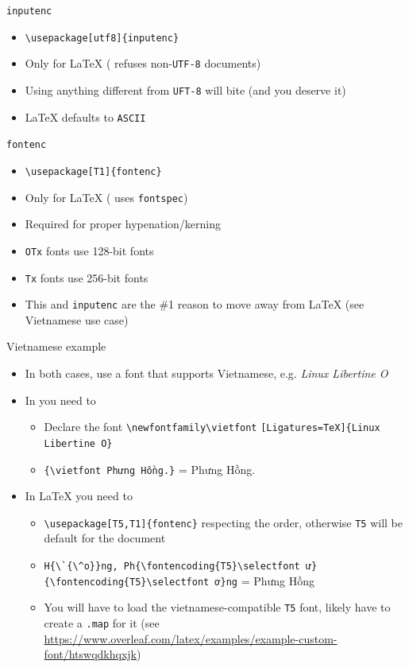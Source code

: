 \documentclass[english]{beamer}
\let\olditem\item
\renewcommand{\item}{\setlength{\itemsep}{\fill}\olditem}
\newenvironment{sitemize}{\let\item\olditem \begin{itemize}}{\vfill\end{itemize}}
\let\textttt\texttt
\renewcommand{\texttt}[1]{\colorbox{gray!10}{\textttt{#1}}}
\begin{document}
\begin{frame}[fragile]{\texttt{inputenc}}
    \begin{itemize}
        \item \verb|\usepackage[utf8]{inputenc}|
        \item Only for \LaTeX{} ( refuses non-\texttt{UTF-8} documents)
        \item Using anything different from \texttt{UFT-8} will bite (and you deserve it)
        \item \LaTeX{} defaults to \texttt{ASCII}
    \end{itemize}
\end{frame}

\begin{frame}[fragile]{\texttt{fontenc}}
\begin{itemize}
    \item \verb|\usepackage[T1]{fontenc}|
    \item Only for \LaTeX{} ( uses \texttt{fontspec})
    \item Required for proper hypenation/kerning
    \item \texttt{OTx} fonts use 128-bit fonts 
    \item \texttt{Tx} fonts use 256-bit fonts
    \item This and \texttt{inputenc} are the \#{}1 reason to move away from \LaTeX{} (see Vietnamese use case)
\end{itemize}
\end{frame}

\begin{frame}[fragile]{Vietnamese example}
\begin{itemize} 
    \item In both cases, use a font that supports Vietnamese, e.g. \textit{Linux Libertine O}
    \item In  you need to
    \begin{sitemize}
        \item Declare the font \verb|\newfontfamily\vietfont| \verb|[Ligatures=TeX]{Linux Libertine O}|
        \item \verb|{\vietfont Phưng Hồng.}| = {\vietfont Phưng Hồng.}
    \end{sitemize}
    
    \item In \LaTeX{} you need to
    \begin{sitemize}
        \item \verb|\usepackage[T5,T1]{fontenc}| respecting the order, otherwise \texttt{T5} will be default for the document
        \item \verb|H{\`{\^o}}ng, Ph{\fontencoding{T5}\selectfont ư}| \verb|{\fontencoding{T5}\selectfont ơ}ng| = Phưng H{\`{\^o}}ng
        \item You will have to load the vietnamese-compatible \texttt{T5} font, likely have to create a \texttt{.map} for it (see \url{https://www.overleaf.com/latex/examples/example-custom-font/htswqdkhqxjk})
    \end{sitemize}
\end{itemize}
\end{frame}
\end{document}
